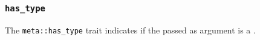 
\subsubsection{\texttt{has\_type}}

The \texttt{meta::has\_type}
trait indicates if the  passed as argument is a .


